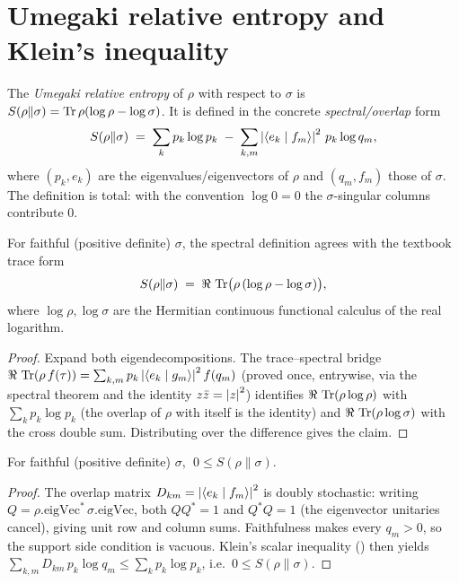 \section{Umegaki relative entropy and Klein's inequality}

\begin{definition}\label{relEntropy}
  \leanok
  The \emph{Umegaki relative entropy} of \(\rho\) with respect to \(\sigma\) is
  \(S(\rho\|\sigma) = \operatorname{Tr}\rho(\log\rho - \log\sigma)\). It is defined in the concrete
  \emph{spectral/overlap} form
  \[
    S(\rho\|\sigma) \;=\; \sum_k p_k\log p_k \;-\; \sum_{k,m}\left\lvert \langle e_k\mid f_m\rangle \right\rvert^2\,
      p_k\log q_m,
  \]
  where \((p_k,e_k)\) are the eigenvalues/eigenvectors of \(\rho\) and \((q_m,f_m)\) those of
  \(\sigma\). The definition is total: with the convention \(\log 0 = 0\) the \(\sigma\)-singular
  columns contribute \(0\).
\end{definition}

\begin{theorem}\label{relEntropy_eq_traceLog}
  \leanok
  For faithful (positive definite) \(\sigma\), the spectral definition agrees with the textbook
  trace form
  \[
    S(\rho\|\sigma) \;=\; \Re\,\operatorname{Tr}\bigl(\rho\,(\log\rho - \log\sigma)\bigr),
  \]
  where \(\log\rho,\log\sigma\) are the Hermitian continuous functional calculus of the real
  logarithm.
\end{theorem}
\begin{proof}\leanok
  Expand both eigendecompositions. The trace--spectral bridge
  \(\Re\,\operatorname{Tr}(\rho\,f(\tau)) = \sum_{k,m} p_k\left\lvert \langle e_k\mid g_m\rangle \right\rvert^2 f(q_m)\) (proved
  once, entrywise, via the spectral theorem and the identity \(z\bar z = \left\lvert z \right\rvert^2\)) identifies
  \(\Re\,\operatorname{Tr}(\rho\log\rho)\) with \(\sum_k p_k\log p_k\) (the overlap of \(\rho\) with itself is
  the identity) and \(\Re\,\operatorname{Tr}(\rho\log\sigma)\) with the cross double sum. Distributing over the
  difference gives the claim.
\end{proof}

\begin{theorem}\label{relEntropy_nonneg}
  \leanok
  For faithful (positive definite) \(\sigma\), \(\;0\le S(\rho\|\sigma)\).
\end{theorem}
\begin{proof}\leanok
  The overlap matrix \(D_{km} = \left\lvert \langle e_k\mid f_m\rangle \right\rvert^2\) is doubly stochastic:
  writing \(Q = \rho.\mathrm{eigVec}^{*}\,\sigma.\mathrm{eigVec}\), both \(QQ^{*} = 1\) and
  \(Q^{*}Q = 1\) (the eigenvector unitaries cancel), giving unit row and column sums.
  Faithfulness makes every \(q_m > 0\), so the support side condition is vacuous. Klein's scalar
  inequality () then yields
  \(\sum_{k,m} D_{km}\,p_k\log q_m \le \sum_k p_k\log p_k\), i.e.\ \(0\le S(\rho\|\sigma)\).
\end{proof}

